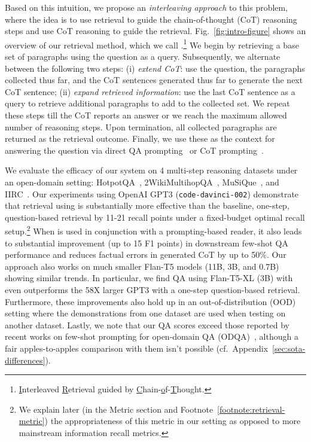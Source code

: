 Based on this intuition, we propose an \emph{interleaving approach} to this problem, where the idea is to use retrieval to guide the chain-of-thought (CoT) reasoning steps and use CoT reasoning to guide the retrieval. Fig.~\ref{fig:intro-figure} shows an overview of our retrieval method, which we call \iconsys.\footnote{\underline{I}nterleaved \underline{R}etrieval guided by \underline{C}hain-\underline{o}f-\underline{T}hought.} We begin by retrieving a base set of paragraphs using the question as a query. Subsequently, we alternate between the following two steps: (i) \textit{extend CoT}: use the question, the paragraphs collected thus far, and the CoT sentences generated thus far to generate the next CoT sentence; (ii) \textit{expand retrieved information}: use the last CoT sentence as a query to retrieve additional paragraphs to add to the collected set. We repeat these steps till the CoT reports an answer or we reach the maximum allowed number of reasoning steps. Upon termination, all collected paragraphs are returned as the retrieval outcome. Finally, we use these as the context for answering the question via direct QA prompting~\cite{originalgpt3} or CoT prompting~\cite{cot}.

We evaluate the efficacy of our system on 4 multi-step reasoning datasets under an open-domain setting: HotpotQA~\cite{hotpotqa}, 2WikiMultihopQA~\cite{xanh2020_2wikimultihop}, MuSiQue~\cite{musique}, and IIRC~\cite{iirc}. Our experiments using OpenAI GPT3 (\texttt{code-davinci-002}) \cite{originalgpt3,instructgpt3,codex} demonstrate that retrieval using \iconsys is substantially more effective than the baseline, one-step, question-based retrieval by 11-21 recall points under a fixed-budget optimal recall setup.\footnote{We explain later (in the Metric section and Footnote~\ref{footnote:retrieval-metric}) the appropriateness of this metric in our setting as opposed to more mainstream information recall metrics.} When \iconsys is used in conjunction with a prompting-based reader, it also leads to substantial improvement (up to 15 F1 points) in downstream few-shot QA performance and reduces factual errors in generated CoT by up to 50\%. Our approach also works on much smaller Flan-T5 models (11B, 3B, and 0.7B) showing similar trends. In particular, we find QA using Flan-T5-XL (3B) with \iconsys even outperforms the 58X larger GPT3 with a one-step question-based retrieval.
Furthermore, these improvements also hold up in an out-of-distribution (OOD) setting where the demonstrations from one dataset are used when testing on another dataset.
Lastly, we note that our QA scores exceed those reported by recent works on few-shot prompting for open-domain QA (ODQA)~\cite{decomp,selfask,react}, although a fair apples-to-apples comparison with them isn't possible (cf.~Appendix~\ref{sec:sota-differences}).

